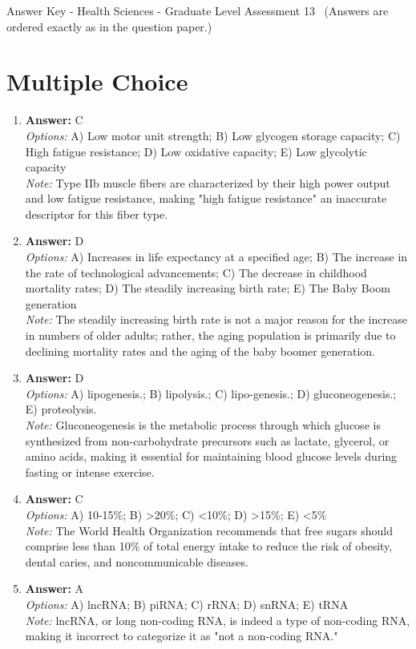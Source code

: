 \documentclass[12pt]{article}
\begin{document}
\begin{center}
Answer Key - Health Sciences - Graduate Level Assessment 13 \
\small (Answers are ordered exactly as in the question paper.)
\end{center}

\section*{Multiple Choice}
\begin{enumerate}[label=\arabic*.]
\item \textbf{Answer:} C
\\ \textit{Options:} A) Low motor unit strength; B) Low glycogen storage capacity; C) High fatigue resistance; D) Low oxidative capacity; E) Low glycolytic capacity
\\ \textit{Note:} Type IIb muscle fibers are characterized by their high power output and low fatigue resistance, making "high fatigue resistance" an inaccurate descriptor for this fiber type.
\item \textbf{Answer:} D
\\ \textit{Options:} A) Increases in life expectancy at a specified age; B) The increase in the rate of technological advancements; C) The decrease in childhood mortality rates; D) The steadily increasing birth rate; E) The Baby Boom generation
\\ \textit{Note:} The steadily increasing birth rate is not a major reason for the increase in numbers of older adults; rather, the aging population is primarily due to declining mortality rates and the aging of the baby boomer generation.
\item \textbf{Answer:} D
\\ \textit{Options:} A) lipogenesis.; B) lipolysis.; C) lipo-genesis.; D) gluconeogenesis.; E) proteolysis.
\\ \textit{Note:} Gluconeogenesis is the metabolic process through which glucose is synthesized from non-carbohydrate precursors such as lactate, glycerol, or amino acids, making it essential for maintaining blood glucose levels during fasting or intense exercise.
\item \textbf{Answer:} C
\\ \textit{Options:} A) 10-15\%; B) \textgreater{}20\%; C) \textless{}10\%; D) \textgreater{}15\%; E) \textless{}5\%
\\ \textit{Note:} The World Health Organization recommends that free sugars should comprise less than 10\% of total energy intake to reduce the risk of obesity, dental caries, and noncommunicable diseases.
\item \textbf{Answer:} A
\\ \textit{Options:} A) lncRNA; B) piRNA; C) rRNA; D) snRNA; E) tRNA
\\ \textit{Note:} lncRNA, or long non-coding RNA, is indeed a type of non-coding RNA, making it incorrect to categorize it as "not a non-coding RNA."
\end{enumerate}
\end{document}
